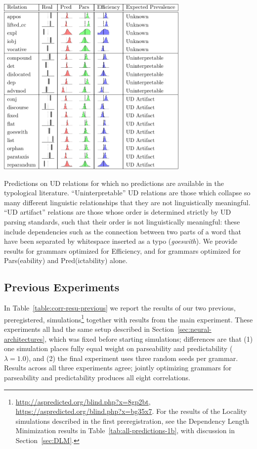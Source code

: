 \documentclass[10pt,twoside,lineno]{article}
\begin{document}
\begin{table} 
	\begin{center}	
\includegraphics[width=0.7\textwidth]{si-table-perrel-2a-1.png}  
\end{center}
\caption{Predictions on UD relations for which no predictions are available in the typological literature.  ``Uninterpretable'' UD relations are those which collapse so many different linguistic relationships that they are not linguistically meaningful. ``UD artifact'' relations are those whose order is determined strictly by UD parsing standards, such that their order is not linguistically meaningful: these include dependencies such as the connection between two parts of a word that have been separated by whitespace inserted as a typo (\emph{goeswith}).
We provide results for grammars optimized for Efficiency, and for grammars optimized for Pars(eability) and Pred(ictability) alone.
}
\label{tab:all-predictions-2}
\end{table}








\subsection{Previous Experiments}\label{sec:previous-exps}
In Table~\ref{table:corr-resu-previous} we report the results of our two previous, preregistered, simulations\footnote{\url{http://aspredicted.org/blind.php?x=8gp2bt}, \url{https://aspredicted.org/blind.php?x=bg35x7}. For the results of the Locality simulations described in the first preregistration, see the Dependency Length Minimization results in Table~\ref{tab:all-predictions-1b}, with discussion in Section~\ref{sec:DLM}.} together with results from the main experiment.
These experiments all had the same setup described in Section~\ref{sec:neural-architectures}, which was fixed before starting simulations; differences are that (1) one simulation places fully equal weight on parseability and predictability ($\lambda=1.0$), and (2) the final experiment uses three random seeds per grammar.
Results across all three experiments agree; jointly optimizing grammars for parseability and predictability produces all eight correlations.
\end{document}
